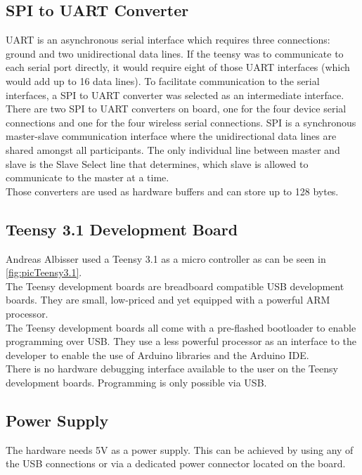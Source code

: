 \subsection{SPI to UART Converter}
UART is an asynchronous serial interface which requires three connections: ground and two unidirectional data lines. If the teensy was to communicate to each serial port directly, it would require eight of those UART interfaces (which would add up to 16 data lines). To facilitate communication to the serial interfaces, a SPI to UART converter was selected as an intermediate interface.\\
There are two SPI to UART converters on board, one for the four device serial connections and one for the four wireless serial connections. SPI is a synchronous master-slave communication interface where the unidirectional data lines are shared amongst all participants. The only individual line between master and slave is the Slave Select line that determines, which slave is allowed to communicate to the master at a time. \\
Those converters are used as hardware buffers and can store up to 128 bytes.\\
%
\subsection{Teensy 3.1 Development Board}
Andreas Albisser used a Teensy 3.1 as a micro controller as can be seen in \autoref{fig:picTeensy3.1}.\\
The Teensy development boards are breadboard compatible USB development boards. They are small, low-priced and yet equipped with a powerful ARM processor.\\
The Teensy development boards all come with a pre-flashed bootloader to enable programming over USB. They use a less powerful processor as an interface to the developer to enable the use of Arduino libraries and the Arduino IDE.\\
There is no hardware debugging interface available to the user on the Teensy development boards. Programming is only possible via USB.\\
%
%
\subsection{Power Supply}
The hardware needs 5V as a power supply. This can be achieved by using any of the USB connections or via a dedicated power connector located on the board. \\
%
%
%
%
%
%
%
